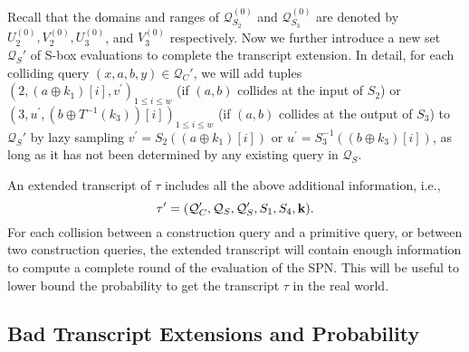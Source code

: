 %
%
Recall that the domains and ranges of $\mathcal{Q}_{S_{2}}^{(0)}$ and $\mathcal{Q}_{S_{3}}^{(0)}$ are denoted by $U_{2}^{(0)},V_{2}^{(0)},U_{3}^{(0)}$, and $V_{3}^{(0)}$ respectively. Now we further introduce a new set $\mathcal{Q}_{S}'$ of S-box evaluations to complete the transcript extension. In detail, for each colliding query $(x,a,b,y)\in\mathcal{Q}_C'$, we will add tuples $\left(2, (a \oplus k_1)[i], v^{\prime}\right)_{1 \leq i \leq w}$ (if $(a, b)$ collides at the input of $S_2$) or $\left(3, u^{\prime}, (b \oplus T^{-1}(k_3))[i]\right)_{1 \leq i \leq w}$ (if $(a, b)$ collides at the output of $S_3$) to $\mathcal{Q}_{S}'$ by lazy sampling $v^{\prime}=S_2(\left(a \oplus k_1\right)[i])$ or $u^{\prime}=S_3^{-1}(\left(b \oplus k_3\right)[i])$, as long as it has not been determined by any existing query in $\mathcal{Q}_S$.


An extended transcript of $\tau$ includes all the above additional information, i.e.,
%
$$\tau'=(\mathcal{Q}_{C}',\mathcal{Q}_{S},\mathcal{Q}_{S}',S_1,S_4,\mathbf{k}).$$
%
For each collision between a construction query and a primitive query, or between two construction queries, the extended transcript will contain enough information to compute a complete round of the evaluation of the SPN. This will be useful to lower bound the probability to get the transcript $\tau$ in the real world.





\subsection{Bad Transcript Extensions and Probability}
\label{sec:bad-tau-4-rounds}

